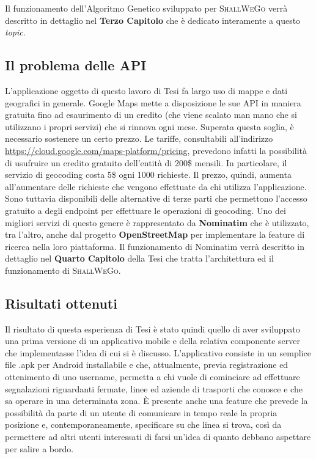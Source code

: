             Il funzionamento dell'Algoritmo Genetico sviluppato per \textsc{ShallWeGo} verrà descritto in dettaglio nel \textbf{Terzo Capitolo} che è dedicato interamente a questo \textit{topic}.

        \subsection{Il problema delle API}
            L'applicazione oggetto di questo lavoro di Tesi fa largo uso di mappe e dati geografici in generale. Google Maps mette a disposizione le sue API in maniera gratuita fino ad esaurimento di un credito (che viene scalato man mano che si utilizzano i propri servizi) che si rinnova ogni mese. Superata questa soglia, è necessario sostenere un certo prezzo.
            Le tariffe, consultabili all'indirizzo \url{https://cloud.google.com/maps-platform/pricing}, prevedono infatti la possibilità di usufruire un credito gratuito dell'entità di 200\$ mensili. In particolare, il servizio di geocoding costa 5\$ ogni 1000 richieste. Il prezzo, quindi, aumenta all'aumentare delle richieste che vengono effettuate da chi utilizza l'applicazione.
            Sono tuttavia disponibili delle alternative di terze parti che permettono l'accesso gratuito a degli endpoint per effettuare le operazioni di geocoding. Uno dei migliori servizi di questo genere è rappresentato da \textbf{Nominatim} che è utilizzato, tra l'altro, anche dal progetto \textbf{OpenStreetMap} per implementare la feature di ricerca nella loro piattaforma. Il funzionamento di Nominatim verrà descritto in dettaglio nel \textbf{Quarto Capitolo} della Tesi che tratta l'architettura ed il funzionamento di \textsc{ShallWeGo}.
    
    \subsection{Risultati ottenuti}
        Il risultato di questa esperienza di Tesi è stato quindi quello di aver sviluppato una prima versione di un applicativo mobile e della relativa componente server che implementasse l'idea di cui si è discusso. L'applicativo consiste in un semplice file .apk per Android installabile e che, attualmente, previa registrazione ed ottenimento di uno username, permetta a chi vuole di cominciare ad effettuare segnalazioni riguardanti fermate, linee ed aziende di trasporti che conosce e che sa operare in una determinata zona.
        È presente anche una feature che prevede la possibilità da parte di un utente di comunicare in tempo reale la propria posizione e, contemporaneamente, specificare su che linea si trova, così da permettere ad altri utenti interessati di farsi un'idea di quanto debbano aspettare per salire a bordo.
        
